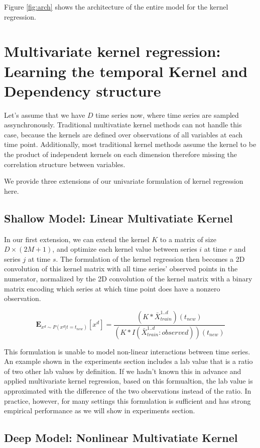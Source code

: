 \documentclass{article} %
\begin{document}
Figure \ref{fig:arch} shows the architecture of the entire model for the kernel regression.

\section{Multivariate kernel regression: Learning the temporal Kernel and Dependency structure}

Let's assume that we have $D$ time series now, where time series are sampled assynchronously. Traditional multivatiate kernel methods can not handle this case, because the kernels are defined over observations of all variables at each time point. Additionally, most traditional kernel methods assume the kernel to be the product of independent kernels on each dimension therefore missing the correlation structure between variables.

We provide three extensions of our univariate formulation of kernel regression here. 

\subsection{Shallow Model: Linear Multivatiate Kernel}
In our first extension, we can extend the kernel $K$ to a matrix of size $D \times (2M+1)$, and optimize each kernel value between series $i$ at time $r$ and series $j$ at time $s$. The formulation of the kernel regression then becomes a 2D convolution of this kernel matrix with all time series' observed points in the numerator, normalized by the 2D convolution of the kernel matrix with a binary matrix encoding which series at which time point does have a nonzero observation. 

$$ \mathbf{E}_{x^d \sim P(x^d|t=t_{new})}[x^d] = \frac{(K \ast \bar X^{1..d}_{train})(t_{new})}{(K \ast I(\bar X^{1..d}_{train} :observed)) (t_{new})} $$

This formulation is unable to model non-linear interactions between time series. An example shown in the experiments section includes a lab value that is a ratio of two other lab values by definition. If we hadn't known this in advance and applied multivariate kernel regression, based on this formualtion, the lab value is approximated with the difference of the two observations instead of the ratio. In practice, however, for many settings this formulation is sufficient and has strong empirical performance as we will show in experiments section.

\subsection{Deep Model: Nonlinear Multivatiate Kernel}
\end{document}
